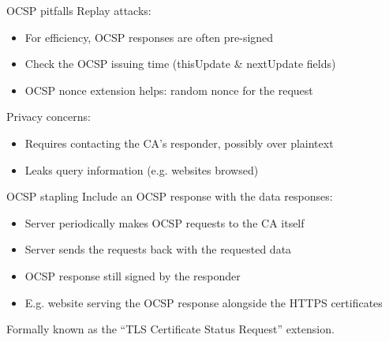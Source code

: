 \begin{frame}{OCSP pitfalls}  
  \pause
  Replay attacks:
  \begin{itemize}[<+(1)->]
    \item For efficiency, OCSP responses are often pre-signed
    \item Check the OCSP issuing time (thisUpdate \& nextUpdate fields)
    \item OCSP nonce extension helps: random nonce for the request
  \end{itemize}

  \vspace*{0.5em}

  \pause
  Privacy concerns:
  \begin{itemize}[<+(1)->]
    \item Requires contacting the CA's responder, possibly over plaintext
    \item Leaks query information (e.g. websites browsed)
  \end{itemize}
\end{frame}

\begin{frame}{OCSP stapling}
  \pause
  Include an OCSP response with the data responses:
  \begin{itemize}[<+(1)->]
    \item Server periodically makes OCSP requests to the CA itself
    \item Server sends the requests back with the requested data
    \item OCSP response still signed by the responder
    \item E.g. website serving the OCSP response alongside the HTTPS certificates
  \end{itemize}

  \pause
  Formally known as the \enquote{TLS Certificate Status Request} extension.
\end{frame}

